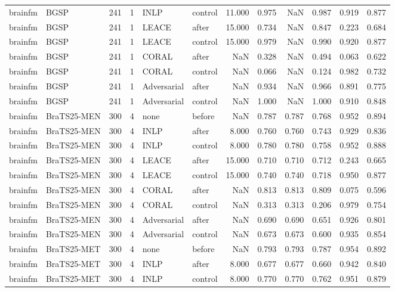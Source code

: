 \begin{tabular}{llrrllrrrrrr}
brainfm & BGSP & 241 & 1 & INLP & control & 11.000 & 0.975 & NaN & 0.987 & 0.919 & 0.877 \\
brainfm & BGSP & 241 & 1 & LEACE & after & 15.000 & 0.734 & NaN & 0.847 & 0.223 & 0.684 \\
brainfm & BGSP & 241 & 1 & LEACE & control & 15.000 & 0.979 & NaN & 0.990 & 0.920 & 0.877 \\
brainfm & BGSP & 241 & 1 & CORAL & after & NaN & 0.328 & NaN & 0.494 & 0.063 & 0.622 \\
brainfm & BGSP & 241 & 1 & CORAL & control & NaN & 0.066 & NaN & 0.124 & 0.982 & 0.732 \\
brainfm & BGSP & 241 & 1 & Adversarial & after & NaN & 0.934 & NaN & 0.966 & 0.891 & 0.775 \\
brainfm & BGSP & 241 & 1 & Adversarial & control & NaN & 1.000 & NaN & 1.000 & 0.910 & 0.848 \\
brainfm & BraTS25-MEN & 300 & 4 & none & before & NaN & 0.787 & 0.787 & 0.768 & 0.952 & 0.894 \\
brainfm & BraTS25-MEN & 300 & 4 & INLP & after & 8.000 & 0.760 & 0.760 & 0.743 & 0.929 & 0.836 \\
brainfm & BraTS25-MEN & 300 & 4 & INLP & control & 8.000 & 0.780 & 0.780 & 0.758 & 0.952 & 0.888 \\
brainfm & BraTS25-MEN & 300 & 4 & LEACE & after & 15.000 & 0.710 & 0.710 & 0.712 & 0.243 & 0.665 \\
brainfm & BraTS25-MEN & 300 & 4 & LEACE & control & 15.000 & 0.740 & 0.740 & 0.718 & 0.950 & 0.877 \\
brainfm & BraTS25-MEN & 300 & 4 & CORAL & after & NaN & 0.813 & 0.813 & 0.809 & 0.075 & 0.596 \\
brainfm & BraTS25-MEN & 300 & 4 & CORAL & control & NaN & 0.313 & 0.313 & 0.206 & 0.979 & 0.754 \\
brainfm & BraTS25-MEN & 300 & 4 & Adversarial & after & NaN & 0.690 & 0.690 & 0.651 & 0.926 & 0.801 \\
brainfm & BraTS25-MEN & 300 & 4 & Adversarial & control & NaN & 0.673 & 0.673 & 0.600 & 0.935 & 0.854 \\
brainfm & BraTS25-MET & 300 & 4 & none & before & NaN & 0.793 & 0.793 & 0.787 & 0.954 & 0.892 \\
brainfm & BraTS25-MET & 300 & 4 & INLP & after & 8.000 & 0.677 & 0.677 & 0.660 & 0.942 & 0.840 \\
brainfm & BraTS25-MET & 300 & 4 & INLP & control & 8.000 & 0.770 & 0.770 & 0.762 & 0.951 & 0.879 \\

\end{tabular}
